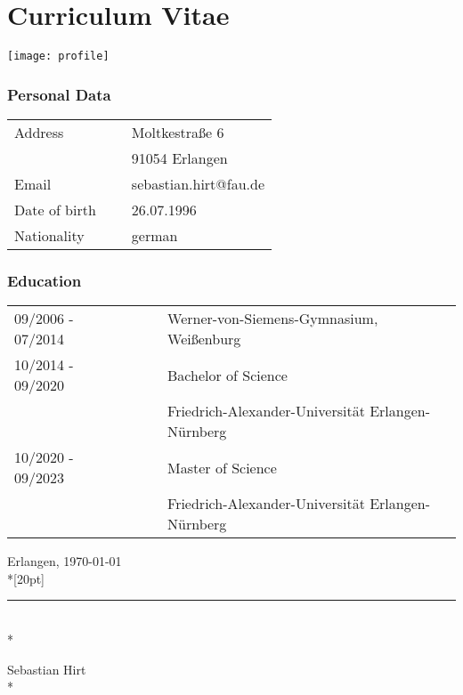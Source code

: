 \chapter*{Curriculum Vitae}
\thispagestyle{empty}



\flushright
\texttt{[image: profile]}
\vspace*{-5cm}
\subsection*{Personal Data}
\flushleft
\normalsize
\begin{tabular}{lcl}
Address             & ~ & Moltkestraße 6\\
                    & ~ & 91054 Erlangen\\[5pt]
Email               & ~ & sebastian.hirt@fau.de\\[5pt]
Date of birth        & ~ & 26.07.1996\\
Nationality & ~ & german\\
\end{tabular} 

\nopagebreak
\subsection*{Education}
\begin{tabular}{lcl}
09/2006 - 07/2014     & ~~~ &  Werner-von-Siemens-Gymnasium, Weißenburg\\
10/2014 - 09/2020     & ~~~ &  Bachelor of Science\\
                      & ~~~ &  Friedrich-Alexander-Universität Erlangen-Nürnberg\\
10/2020 - 09/2023     & ~~~ &  Master of Science\\
                      & ~~~ &  Friedrich-Alexander-Universität Erlangen-Nürnberg\\
\end{tabular}

\vfill


Erlangen, \today \\*[20pt]\nopagebreak
\vspace{0.5cm}


\rule{5cm}{0.4pt}\\*\nopagebreak


Sebastian Hirt\\*\nopagebreak
